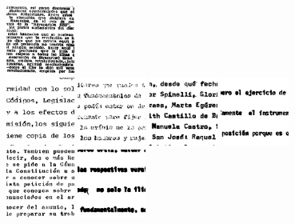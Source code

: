\documentclass[11pt,a4paper]{article}
\begin{document}
\begin{figure}
\includegraphics[width=0.2\textwidth]{r0566_0121.jpg}\\
\centering%
\includegraphics[width=0.2\textwidth]{r0566_0138.jpg}%
\includegraphics[width=0.2\textwidth]{r0566_0148.jpg}%
\includegraphics[width=0.2\textwidth]{r0566_0219.jpg}%
\includegraphics[width=0.2\textwidth]{r0566_0369.jpg}\\
\centering%
\includegraphics[width=0.2\textwidth]{r0566_0512.jpg}%
\includegraphics[width=0.2\textwidth]{r0566_0539.jpg}%

\end{figure}
\end{document}
